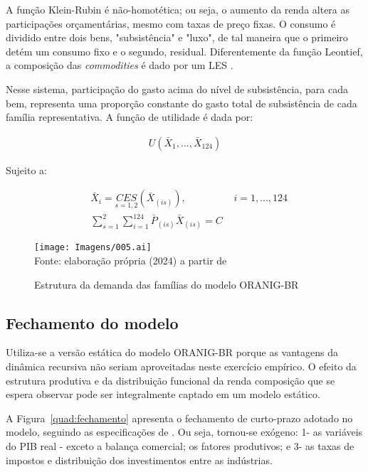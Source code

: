 A função Klein-Rubin é não-homotética; ou seja, o aumento da renda altera as participações orçamentárias, mesmo com taxas de preço fixas. O consumo é dividido entre dois bens, "subsistência" e "luxo", de tal maneira que o primeiro detém um consumo fixo e o segundo, residual. Diferentemente da função Leontief, a composição das \textit{commodities} é dado por um LES \cite{horridge03}.

Nesse sistema, participação do gasto acima do nível de subsistência, para cada bem, representa uma proporção constante do gasto total de subsistência de cada família representativa. A função de utilidade é dada por:

\begin{align*}
	U(\bar{X}_1, ... , \bar{X}_{124})
\end{align*}

Sujeito a:

\begin{align}
	&\bar{X}_i = \underset{s = 1, 2}{CES} (\bar{X}_{(is)}), \hspace{2cm} i = 1, ... , 124 \\
	&\sum_{s = 1}^{2} \sum_{i = 1}^{124} \bar{P}_{(is)} \bar{X}_{(is)} = C
\end{align}

\begin{landscape}
	\begin{figure}
		\centering
		\caption{Estrutura da demanda das famílias do modelo ORANIG-BR} \label{fig:estrutura_familia}
		\texttt{[image: Imagens/005.ai]}
		\footnotesize \\
		Fonte: elaboração própria (2024) a partir de \textcite{horridge00}
	\end{figure}
\end{landscape}

\subsection{Fechamento do modelo} \label{subsec:fechamento}

Utiliza-se a versão estática do modelo ORANIG-BR porque as vantagens da dinâmica recursiva não seriam aproveitadas neste exercício empírico. O efeito da estrutura produtiva e da distribuição funcional da renda composição que se espera observar pode ser integralmente captado em um modelo estático.

A Figura~\ref{quad:fechamento} apresenta o fechamento de curto-prazo adotado no modelo, seguindo as especificações de \textcite{horridge03}. Ou seja, tornou-se exógeno: 1- as variáveis do PIB real - exceto a balança comercial; os fatores produtivos; e 3- as taxas de impostos e distribuição dos investimentos entre as indústrias.

